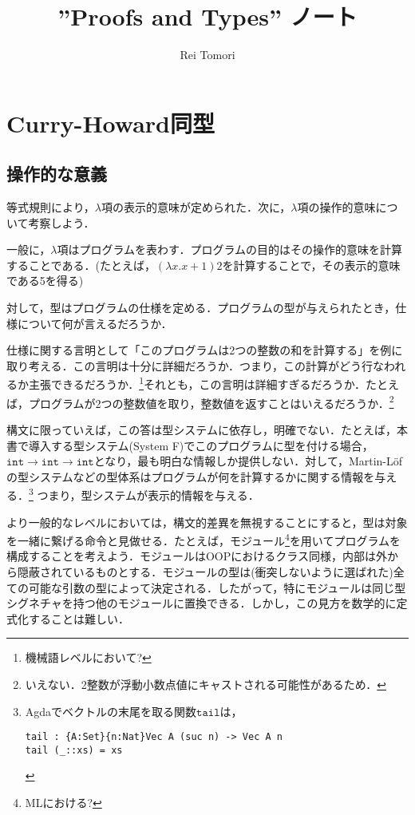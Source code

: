 \documentclass[a4paper,10pt,platex]{jsarticle}
\title{''Proofs and Types'' ノート}
\author{Rei Tomori}
\begin{document}
\maketitle
\section{Curry-Howard同型}
\subsection{操作的な意義}
等式規則により，$\lambda$項の表示的意味が定められた．次に，$\lambda$項の操作的意味について考察しよう．

一般に，$\lambda$項はプログラムを表わす．プログラムの目的はその操作的意味を計算することである．(たとえば，$(\lambda x. x + 1) 2$を計算することで，その表示的意味である5を得る)

対して，型はプログラムの仕様を定める．プログラムの型が与えられたとき，仕様について何が言えるだろうか．

仕様に関する言明として「このプログラムは2つの整数の和を計算する」を例に取り考える．この言明は十分に詳細だろうか．つまり，この計算がどう行なわれるか主張できるだろうか．\footnote{機械語レベルにおいて?}それとも，この言明は詳細すぎるだろうか．たとえば，プログラムが2つの整数値を取り，整数値を返すことはいえるだろうか．\footnote{いえない．2整数が浮動小数点値にキャストされる可能性があるため．}

構文に限っていえば，この答は型システムに依存し，明確でない．たとえば，本書で導入する型システム(System F)でこのプログラムに型を付ける場合，$\mathtt{int\rightarrow int \rightarrow int}$となり，最も明白な情報しか提供しない．対して，Martin-L\"ofの型システムなどの型体系はプログラムが何を計算するかに関する情報を与える．\footnote{Agdaでベクトルの末尾を取る関数$\mathtt{tail}$は，\begin{lstlisting}
tail : {A:Set}{n:Nat}Vec A (suc n) -> Vec A n
tail (_::xs) = xs
\end{lstlisting}}
つまり，型システムが表示的情報を与える．

より一般的なレベルにおいては，構文的差異を無視することにすると，型は対象を一緒に繋げる命令と見做せる．たとえば，モジュール\footnote{MLにおける?}を用いてプログラムを構成することを考えよう．モジュールはOOPにおけるクラス同様，内部は外から隠蔽されているものとする．モジュールの型は(衝突しないように選ばれた)全ての可能な引数の型によって決定される．したがって，特にモジュールは同じ型シグネチャを持つ他のモジュールに置換できる．しかし，この見方を数学的に定式化することは難しい．
\end{document}
